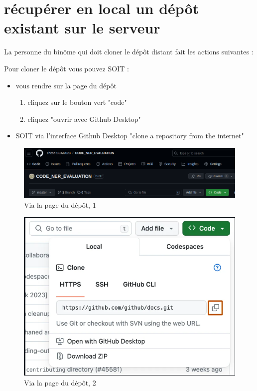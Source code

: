 \section{récupérer en local un dépôt existant sur le serveur}
La personne du binôme qui doit cloner le dépôt distant fait les actions suivantes :


Pour cloner le dépôt vous pouvez SOIT :
\begin{itemize}
\item  vous rendre sur la page du dépôt
\begin{enumerate}
\item cliquez sur le bouton vert "code" 
\item cliquez "ouvrir avec Github Desktop"
\end{enumerate}
\item SOIT via l'interface  Github Desktop "clone a repository from the internet"
\end{itemize}

\begin{figure}[H]
\caption{Via la page du dépôt, 1}
  \includegraphics[width=12cm]{images/bouton_code.png}
\end{figure}

\begin{figure}[H]
\caption{Via la page du dépôt, 2}
  \includegraphics[width=12cm]{images/clone_github_desktop.png}
\end{figure}



